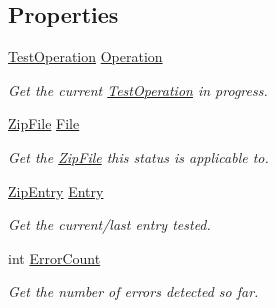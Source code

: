 \subsection*{Properties}
\begin{DoxyCompactItemize}
\item 
\hyperlink{namespace_i_c_sharp_code_1_1_sharp_zip_lib_1_1_zip_ac2c93a91b7fd0e8c82d654452f736726}{Test\+Operation} \hyperlink{class_i_c_sharp_code_1_1_sharp_zip_lib_1_1_zip_1_1_test_status_ac8a7bd5c3f195f8e9d9f8584243bbe8b}{Operation}
\begin{DoxyCompactList}\small\item\em Get the current \hyperlink{namespace_i_c_sharp_code_1_1_sharp_zip_lib_1_1_zip_ac2c93a91b7fd0e8c82d654452f736726}{Test\+Operation} in progress. \end{DoxyCompactList}\item 
\hyperlink{class_i_c_sharp_code_1_1_sharp_zip_lib_1_1_zip_1_1_zip_file}{Zip\+File} \hyperlink{class_i_c_sharp_code_1_1_sharp_zip_lib_1_1_zip_1_1_test_status_a037289f000b4315b78ac78f42faefad2}{File}
\begin{DoxyCompactList}\small\item\em Get the \hyperlink{class_i_c_sharp_code_1_1_sharp_zip_lib_1_1_zip_1_1_zip_file}{Zip\+File} this status is applicable to. \end{DoxyCompactList}\item 
\hyperlink{class_i_c_sharp_code_1_1_sharp_zip_lib_1_1_zip_1_1_zip_entry}{Zip\+Entry} \hyperlink{class_i_c_sharp_code_1_1_sharp_zip_lib_1_1_zip_1_1_test_status_a63265dcbd22480a66a1efdde44d939fc}{Entry}
\begin{DoxyCompactList}\small\item\em Get the current/last entry tested. \end{DoxyCompactList}\item 
int \hyperlink{class_i_c_sharp_code_1_1_sharp_zip_lib_1_1_zip_1_1_test_status_ae69ee34a5bca29c5ad74c9ba757079db}{Error\+Count}
\begin{DoxyCompactList}\small\item\em Get the number of errors detected so far. \end{DoxyCompactList}\item 

\end{DoxyCompactItemize}

